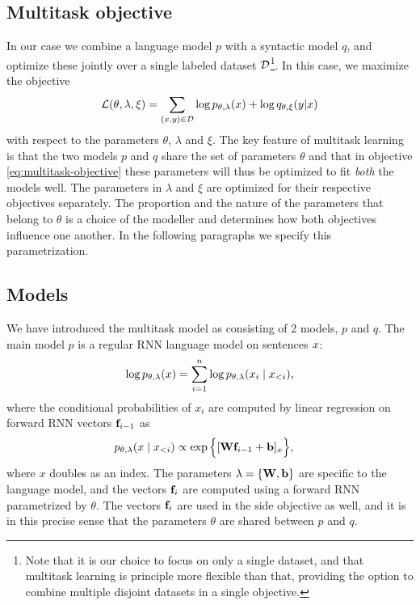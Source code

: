 \subsection{Multitask objective}
  In our case we combine a language model $p$ with a syntactic model $q$, and optimize these jointly over a single labeled dataset $\mathcal{D}$\footnote{Note that it is our choice to focus on only a single dataset, and that multitask learning is principle more flexible than that, providing the option to combine multiple disjoint datasets in a single objective.}. In this case, we maximize the objective
  \begin{equation}
    \label{eq:multitask-objective}
    \mathcal{L}(\theta, \lambda, \xi) = \sum_{ (x, y) \in \mathcal{D} }\log p_{\theta, \lambda}(x) + \log q_{\theta,\xi}(y | x)
  \end{equation}
  with respect to the parameters $\theta$, $\lambda$ and $\xi$. The key feature of multitask learning is that the two models $p$ and $q$ share the set of parameters $\theta$ and that in objective \ref{eq:multitask-objective} these parameters will thus be optimized to fit \textit{both} the models well. The parameters in $\lambda$ and $\xi$ are optimized for their respective objectives separately. The proportion and the nature of the parameters that belong to $\theta$ is a choice of the modeller and determines how both objectives influence one another. In the following paragraphs we specify this parametrization.

\subsection{Models}
  We have introduced the multitask model as consisting of 2 models, $p$ and $q$. The main model $p$ is a regular RNN language model on sentences $x$:
  \begin{align*}
    \log p_{\theta, \lambda}(x) = \sum_{i=1}^n \log p_{\theta, \lambda}(x_i \mid x_{<i}),
  \end{align*}
  where the conditional probabilities of $x_i$ are computed by linear regression on forward RNN vectors $\mathbf{f}_{i-1}$ as
  \begin{align*}
    p_{\theta, \lambda}( x \mid x_{<i}) &\propto \exp \Big \{ [ \mathbf{W} \mathbf{f}_{i-1} + \mathbf{b} ]_{x} \Big\},
  \end{align*}
  where $x$ doubles as an index. The parameters $\lambda = \{ \mathbf{W}, \mathbf{b} \}$ are specific to the language model, and the vectors $\mathbf{f}_i$ are computed using a forward RNN parametrized by $\theta$. The vectors $\mathbf{f}_i$ are used in the side objective as well, and it is in this precise sense that the parameters $\theta$ are shared between $p$ and $q$.

